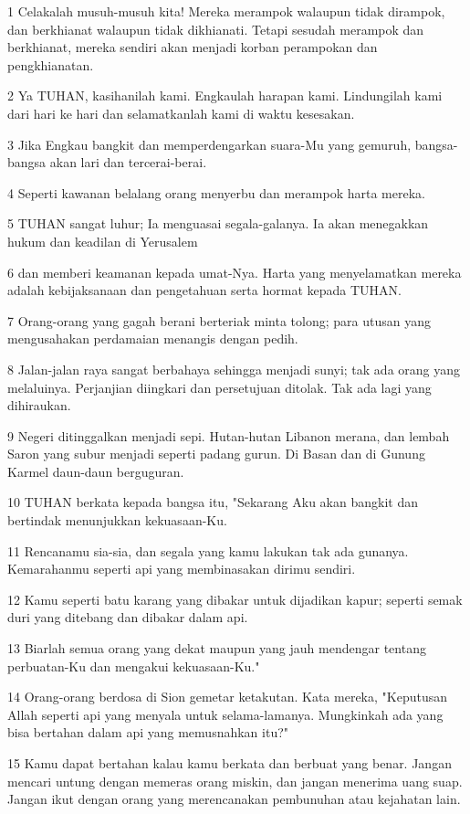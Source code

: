 \par 1 Celakalah musuh-musuh kita! Mereka merampok walaupun tidak dirampok, dan berkhianat walaupun tidak dikhianati. Tetapi sesudah merampok dan berkhianat, mereka sendiri akan menjadi korban perampokan dan pengkhianatan.
\par 2 Ya TUHAN, kasihanilah kami. Engkaulah harapan kami. Lindungilah kami dari hari ke hari dan selamatkanlah kami di waktu kesesakan.
\par 3 Jika Engkau bangkit dan memperdengarkan suara-Mu yang gemuruh, bangsa-bangsa akan lari dan tercerai-berai.
\par 4 Seperti kawanan belalang orang menyerbu dan merampok harta mereka.
\par 5 TUHAN sangat luhur; Ia menguasai segala-galanya. Ia akan menegakkan hukum dan keadilan di Yerusalem
\par 6 dan memberi keamanan kepada umat-Nya. Harta yang menyelamatkan mereka adalah kebijaksanaan dan pengetahuan serta hormat kepada TUHAN.
\par 7 Orang-orang yang gagah berani berteriak minta tolong; para utusan yang mengusahakan perdamaian menangis dengan pedih.
\par 8 Jalan-jalan raya sangat berbahaya sehingga menjadi sunyi; tak ada orang yang melaluinya. Perjanjian diingkari dan persetujuan ditolak. Tak ada lagi yang dihiraukan.
\par 9 Negeri ditinggalkan menjadi sepi. Hutan-hutan Libanon merana, dan lembah Saron yang subur menjadi seperti padang gurun. Di Basan dan di Gunung Karmel daun-daun berguguran.
\par 10 TUHAN berkata kepada bangsa itu, "Sekarang Aku akan bangkit dan bertindak menunjukkan kekuasaan-Ku.
\par 11 Rencanamu sia-sia, dan segala yang kamu lakukan tak ada gunanya. Kemarahanmu seperti api yang membinasakan dirimu sendiri.
\par 12 Kamu seperti batu karang yang dibakar untuk dijadikan kapur; seperti semak duri yang ditebang dan dibakar dalam api.
\par 13 Biarlah semua orang yang dekat maupun yang jauh mendengar tentang perbuatan-Ku dan mengakui kekuasaan-Ku."
\par 14 Orang-orang berdosa di Sion gemetar ketakutan. Kata mereka, "Keputusan Allah seperti api yang menyala untuk selama-lamanya. Mungkinkah ada yang bisa bertahan dalam api yang memusnahkan itu?"
\par 15 Kamu dapat bertahan kalau kamu berkata dan berbuat yang benar. Jangan mencari untung dengan memeras orang miskin, dan jangan menerima uang suap. Jangan ikut dengan orang yang merencanakan pembunuhan atau kejahatan lain.

